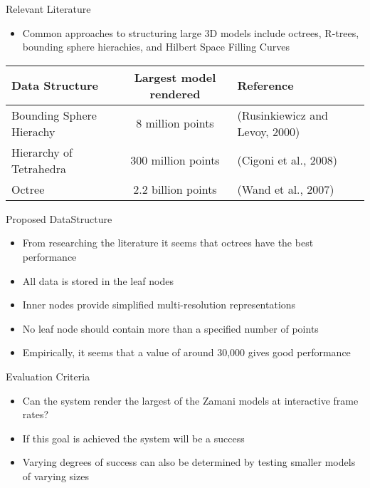 \documentclass{beamer}
\begin{document}
\begin{frame}{Relevant Literature}

\begin{itemize}
\item Common approaches to structuring large 3D models include octrees,
  R-trees, bounding sphere hierachies, and Hilbert Space Filling
  Curves
\end{itemize}
{\scriptsize
\begin{tabular}{l|c|l}
 Data Structure & Largest model rendered & Reference \\
\hline
\hline
Bounding Sphere Hierachy  & 8 million points & (Rusinkiewicz and Levoy, 2000) \\
\hline
Hierarchy of Tetrahedra   & 300 million points& (Cigoni et al., 2008)  \\
\hline
Octree          & 2.2 billion points& (Wand et al., 2007)    \\
\end{tabular}}

\end{frame}


\begin{frame}{Proposed DataStructure}

\begin{itemize}
\item From researching the literature it seems that octrees have the best
  performance
\item All data is stored in the leaf nodes
\item Inner nodes provide simplified multi-resolution representations
\item No leaf node should contain more than a specified number of points
\item Empirically, it seems that a value of around 30,000 gives good performance
\end{itemize}
\end{frame}


\begin{frame}{Evaluation Criteria}
\begin{itemize}
\item Can the system render the largest of the Zamani models at interactive
  frame rates?
\item If this goal is achieved the system will be a success
\item Varying degrees of success can also be determined by testing smaller
  models of varying sizes
\end{itemize}
\end{frame}
\end{document}
